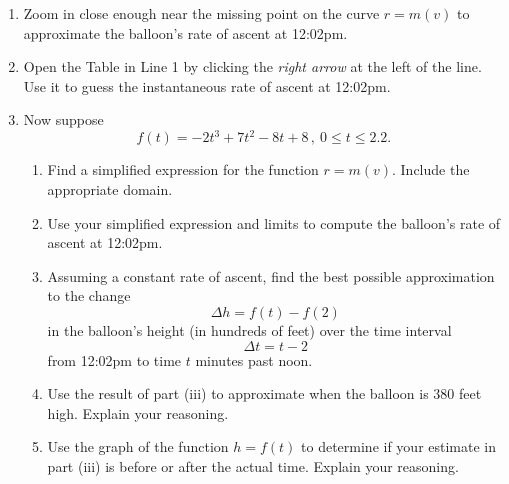 \documentclass{ximera}
\begin{document}
\begin{question}
\begin{enumerate}
\item Zoom in close enough near the missing point on the curve $r=m(v)$ to approximate the balloon's rate of ascent at 12:02pm.

\item Open the Table in Line 1 by clicking the \emph{right arrow} at the left of the line. Use it to guess the instantaneous rate of ascent at 12:02pm.

\item Now suppose
\[
   f(t) = -2t^3+7t^2-8t+8 \, , \ 0\leq t \leq 2.2.
\]

\begin{enumerate}
\item Find a simplified expression for the function $r=m(v)$. Include the appropriate domain.

\item Use your simplified expression and limits to compute the balloon's rate of ascent at 12:02pm.

\item Assuming a constant rate of ascent, find the best possible approximation to the change
\[
     \Delta h = f(t) - f(2)
\]
in the balloon's height (in hundreds of feet) over the time interval
\[
  \Delta t = t - 2
\]
from 12:02pm to time $t$ minutes past noon. 

\item Use the result of part (iii) to approximate when the balloon is $380$ feet high. Explain your reasoning.

\item Use the graph of the function $h=f(t)$ to determine if your estimate in part (iii) is before or after the actual time. Explain your reasoning.



\end{enumerate}

\end{enumerate}
\end{question}
\end{document}
